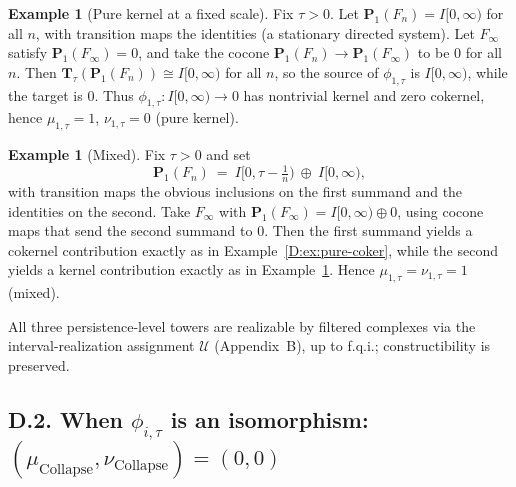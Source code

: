 \documentclass[11pt]{article}
\numberwithin{equation}{section}
\theoremstyle{definition}
\newtheorem{example}[theorem]{Example}
\DeclareRobustCommand{\muc}{\mu_{\mathrm{Collapse}}}
\DeclareRobustCommand{\nuc}{\nu_{\mathrm{Collapse}}}
\begin{document}
\begin{example}[Pure kernel at a fixed scale]\label{D:ex:pure-ker}
Fix \(\tau>0\).
Let \(\mathbf{P}_1(F_n)=I[0,\infty)\) for all \(n\), with transition maps the identities (a stationary directed system).
Let \(F_\infty\) satisfy \(\mathbf{P}_1(F_\infty)=0\), and take the cocone \(\mathbf{P}_1(F_n)\to \mathbf{P}_1(F_\infty)\) to be \(0\) for all \(n\).
Then \(\mathbf{T}_\tau(\mathbf{P}_1(F_n))\cong I[0,\infty)\) for all \(n\), so the source of \(\phi_{1,\tau}\) is \(I[0,\infty)\), while the target is \(0\).
Thus \(\phi_{1,\tau}: I[0,\infty)\to 0\) has nontrivial kernel and zero cokernel, hence \(\mu_{1,\tau}=1\), \(\nu_{1,\tau}=0\) (pure kernel).
\end{example}

\begin{example}[Mixed]\label{D:ex:mixed}
Fix \(\tau>0\) and set
\[
\mathbf{P}_1(F_n)\ =\ I[0,\tau-\tfrac1n)\ \oplus\ I[0,\infty),
\]
with transition maps the obvious inclusions on the first summand and the identities on the second.
Take \(F_\infty\) with \(\mathbf{P}_1(F_\infty)=I[0,\infty)\oplus 0\), using cocone maps that send the second summand to \(0\).
Then the first summand yields a cokernel contribution exactly as in Example~\ref{D:ex:pure-coker}, while the second yields a kernel contribution exactly as in Example~\ref{D:ex:pure-ker}.
Hence \(\mu_{1,\tau}=\nu_{1,\tau}=1\) (mixed).
\end{example}

All three persistence-level towers are realizable by filtered complexes via the interval-realization assignment \(\mathcal{U}\) (Appendix~B), up to f.q.i.; constructibility is preserved.

\subsection*{D.2. When \texorpdfstring{$\phi_{i,\tau}$}{phi} is an isomorphism: \texorpdfstring{$(\muc,\nuc)=(0,0)$}{(mu,nu)=(0,0)}}
\end{document}
